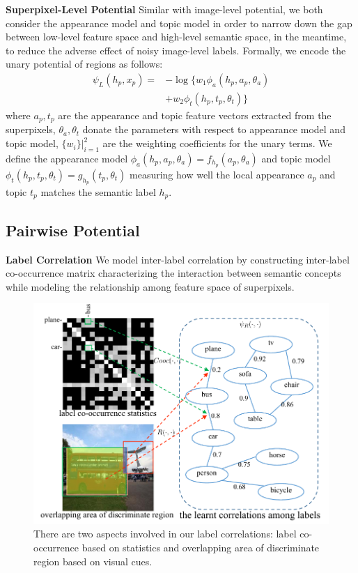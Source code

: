 \textbf{Superpixel-Level Potential}
Similar with image-level potential, we both consider the appearance model and topic model in order to narrow down the gap between low-level feature space and high-level semantic space, in the meantime, to reduce the adverse effect of noisy image-level labels. Formally, we encode the unary potential of regions as follows:
\begin{equation}
    \begin{aligned}
        \psi_{L}(h_p,x_p) = &- \log \big\{ w_1\phi_a(h_p,a_p,\theta_a) \\
        &+ w_2\phi_t(h_p,t_p,\theta_t) \big\}
    \end{aligned}
    \label{eq:local}
\end{equation}
where $a_p, t_p$ are the appearance and topic feature vectors extracted from the superpixels, $\theta_a, \theta_t$ donate the parameters with respect to appearance model and topic model, $\{w_i\}|_{i=1}^2$ are the weighting coefficients for the unary terms. We define the appearance model $\phi_a(h_p,a_p,\theta_a) = f_{h_p}(a_p,\theta_a)$ and topic model $\phi_t(h_p,t_p,\theta_t) = g_{h_p}(t_p,\theta_t)$ measuring how well the local appearance $a_p$ and topic $t_p$ matches the semantic label $h_p$.

\subsection{Pairwise Potential}

\textbf{Label Correlation}
We model inter-label correlation by constructing inter-label co-occurrence matrix characterizing the interaction between semantic concepts while modeling the relationship among feature space of superpixels.

\begin{figure}[htb]
    \begin{center}
        \includegraphics[width=1\linewidth]{fig_correlations.pdf}
    \end{center}
    \caption{There are two aspects involved in our label correlations: label co-occurrence based on statistics and overlapping area of discriminate region based on visual cues.}
    \label{fig:correlations}
\end{figure}

